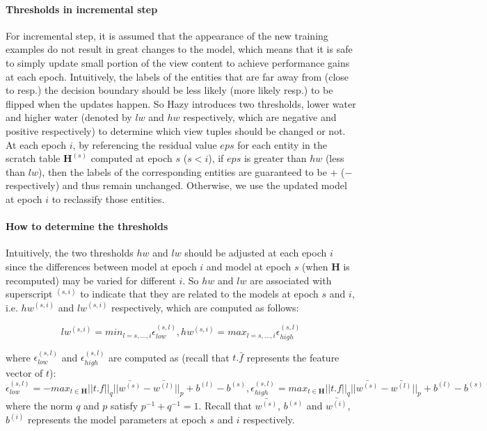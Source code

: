 \paragraph{Thresholds in incremental step}
For incremental step, it is assumed that the appearance of the new training examples do not result in great changes to the model, which means that it is safe to simply update small portion of the view content to achieve performance gains at each epoch. Intuitively, the labels of the entities that are far away from (close to resp.) the decision boundary should be less likely (more likely resp.) to be flipped when the updates happen. So Hazy introduces two thresholds, lower water and higher water (denoted by $lw$ and $hw$ respectively, which are negative and positive respectively) to determine which view tuples should be changed or not. At each epoch $i$, by referencing the residual value $eps$ for each entity in the scratch table $\textbf{H}^{(s)}$ computed at epoch $s$ ($s<i$), if $eps$ is greater than $hw$ (less than $lw$), then the labels of the corresponding entities are guaranteed to be $+$ ($-$ respectively) and thus remain unchanged. Otherwise, we use the updated model at epoch $i$ to reclassify those entities. 

\paragraph{How to determine the thresholds}
Intuitively, the two thresholds $hw$ and $lw$ should be adjusted at each epoch $i$ since the differences between model at epoch $i$ and model at epoch $s$ (when $\textbf{H}$ is recomputed) may be varied for different $i$. So $hw$ and $lw$ are associated with superscript $^{(s,i)}$ to indicate that they are related to the models at epoch $s$ and $i$, i.e. $hw^{(s,i)}$ and $lw^{(s,i)}$ respectively, which are computed as follows:

\begin{equation}
    lw^{(s,i)} = min_{l=s,\dots, i}\epsilon_{low}^{(s,l)},
    hw^{(s,i)} = max_{l=s,\dots, i}\epsilon_{high}^{(s,l)}
\end{equation}

where $\epsilon_{low}^{(s,l)}$ and $\epsilon_{high}^{(s,l)}$ are computed as (recall that $t.\bar{f}$ represents the feature vector of $t$):
\begin{equation}\label{eq: epsilon}
    \epsilon_{low}^{(s,l)} = -max_{t \in \textbf{H}}||t.f||_q||\bar{w^{(s)}}-\bar{w^{(l)}}||_p+b^{(l)}-b^{(s)}, \epsilon_{high}^{(s,l)} = max_{t \in \textbf{H}}||t.f||_q||\bar{w^{(s)}}-\bar{w^{(l)}}||_p+b^{(l)}-b^{(s)}
\end{equation}
where the norm $q$ and $p$ satisfy $p^{-1} + q^{-1} = 1$. Recall that $\bar{w^{(s)}}$, $b^{(s)}$ and $\bar{w^{(i)}}$, $b^{(i)}$ represents the model parameters at epoch $s$ and $i$ respectively.



